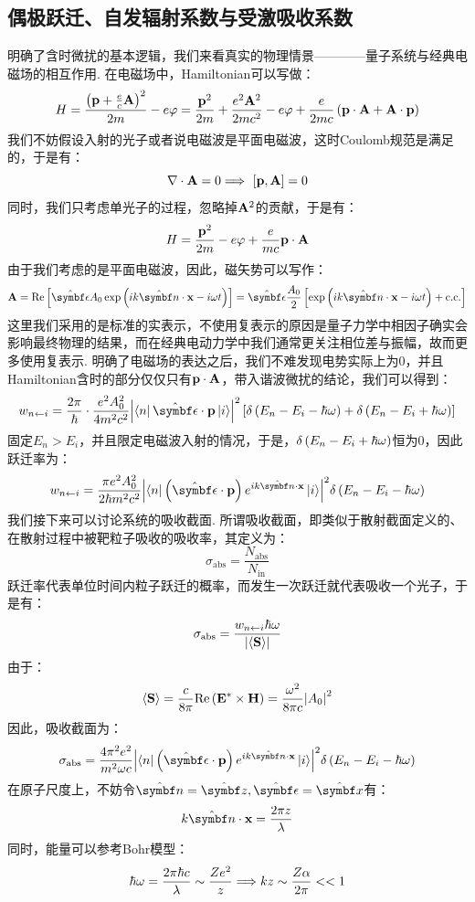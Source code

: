 \subsection{偶极跃迁、自发辐射系数与受激吸收系数}
明确了含时微扰的基本逻辑，我们来看真实的物理情景————量子系统与经典电磁场的相互作用. 在电磁场中，Hamiltonian可以写做：
\[
H = \frac{\left({\mathbf{p}+\frac{e}{c}\mathbf{A}}\right)^{2}}{2m} - e\varphi = \frac{\mathbf{p}^{2}}{2m} + \frac{e^{2}\mathbf{A}^{2}}{2mc^{2}} - e\varphi + \frac{e}{2mc}\left({\mathbf{p}\cdot\mathbf{A} + \mathbf{A}\cdot\mathbf{p}}\right)
\]
我们不妨假设入射的光子或者说电磁波是平面电磁波，这时Coulomb规范是满足的，于是有：
\[
\nabla\cdot\vA = 0 \Longrightarrow\ \mbr{\vp,\vA} = 0
\]
同时，我们只考虑单光子的过程，忽略掉\(\mathbf{A}^{2}\)的贡献，于是有：
\[
H = \frac{\mathbf{p}^{2}}{2m} - e\varphi + \frac{e}{mc}\mathbf{p}\cdot\mathbf{A}
\]
由于我们考虑的是平面电磁波，因此，磁矢势可以写作：
\[
\vA = \mathrm{Re}\mbr{\uv{\epsilon}A_{0}\exp\br{ik\uv{n}\cdot\vr - i\omega t}} = \uv{\epsilon}\frac{A_{0}}{2}\mbr{\exp\br{ik\uv{n}\cdot\vr-i\omega t}+\mathrm{c.c.}}
\]
这里我们采用的是标准的实表示，不使用复表示的原因是量子力学中相因子确实会影响最终物理的结果，而在经典电动力学中我们通常更关注相位差与振幅，故而更多使用复表示. 明确了电磁场的表达之后，我们不难发现电势实际上为0，并且Hamiltonian含时的部分仅仅只有\(\mathbf{p}\cdot\mathbf{A}\)，带入谐波微扰的结论，我们可以得到：
\[
w_{\jump{n}{i}} = \frac{2\pi}{\hh}\cdot\frac{e^{2}A_{0}^{2}}{4m^{2}c^{2}}\abs{\bra{n}\uv{\epsilon}\cdot\vp\ket{i}}^{2}\mbr{\delta\br{E_{n}-E_{i}-\hh\omega}+\delta\br{E_{n}-E_{i}+\hh\omega}}
\]
固定\(E_{n}>E_{i}\)，并且限定电磁波入射的情况，于是，\(\delta\left({E_{n}-E_{i}+\hbar\omega}\right)\)恒为0，因此跃迁率为：
\[
w_{\jump{n}{i}} = \frac{\pi e^{2}A_{0}^{2}}{2\hh m^{2}c^{2}}\abs{\bra{n}\br{\uv{\epsilon}\cdot\vp}e^{ik\uv{n}\cdot\vr}\ket{i}}^{2}\delta\br{E_{n}-E_{i}-\hh\omega}
\]
我们接下来可以讨论系统的吸收截面. 所谓吸收截面，即类似于散射截面定义的、在散射过程中被靶粒子吸收的吸收率，其定义为：
\[
\sigma_{\mathrm{abs}} = \frac{N_{\mathrm{abs}}}{N_{\mathrm{in}}}
\]
跃迁率代表单位时间内粒子跃迁的概率，而发生一次跃迁就代表吸收一个光子，于是有：
\[
\sigma_{\mathrm{abs}} = \frac{w_{{n}\leftarrow{i}}\hbar\omega}{\abs{\left\langle{\mathbf{S}}\right\rangle}}
\]
由于：
\[
\left\langle{\mathbf{S}}\right\rangle = \frac{c}{8\pi}\mathrm{Re}\left({\mathbf{E}^{*}\times\mathbf{H}}\right) = \frac{\omega^{2}}{8\pi c}\abs{A_{0}}^{2}
\]
因此，吸收截面为：
\[
\sigma_{\mathrm{abs}} = \frac{4\pi^{2}e^{2}}{m^{2}\omega c}\abs{\bra{n}\br{\uv{\epsilon}\cdot\vp}e^{ik\uv{n}\cdot\vr}\ket{i}}^{2}\delta\br{E_{n}-E_{i}-\hh\omega}
\]
在原子尺度上，不妨令\(\uv{n}=\uv{z},\uv{\epsilon}=\uv{x}\)有：
\[
k\uv{n}\cdot\vr = \frac{2\pi z}{\lambda}
\]
同时，能量可以参考Bohr模型：
\[
\hbar\omega = \frac{2\pi\hbar c}{\lambda} \sim \frac{Ze^{2}}{z} \Longrightarrow kz \sim \frac{Z\alpha}{2\pi} << 1
\]
